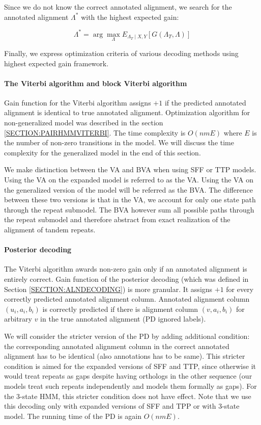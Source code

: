Since we do not know the correct annotated alignment, we search for the
annotated alignment $\Lambda^*$ with the highest expected gain:

\begin{equation}
\Lambda^* = \arg\max_{\Lambda}
E_{\Lambda_T\mid X, Y}\left[G(\Lambda_T, \Lambda)\right]
\end{equation}

Finally, we express optimization criteria of various decoding methods using
highest expected gain framework.

\paragraph{The Viterbi algorithm and block Viterbi algorithm} Gain function for
the Viterbi algorithm assigns $+1$ if the predicted annotated alignment is identical to true
annotated alignment. Optimization algorithm for non-generalized model was
described in the section \ref{SECTION:PAIRHMMVITERBI}. The time complexity is
$O(nmE)$ where $E$ is the number of non-zero transitions in the model. We will
discuss the time complexity for the generalized model in the end of this
section.

We make distinction between the VA and BVA when using SFF or TTP models. Using
the VA on the expanded model is referred to as the VA. Using the VA on the
generalized version of the model will be referred as the BVA. The difference
between these two versions is that in the VA, we account for only one state
path through the repeat submodel.  The BVA however sum all possible paths
through the repeat submodel and therefore abstract from exact realization of
the alignment of tandem repeats.

\paragraph{Posterior decoding}
The Viterbi algorithm awards non-zero gain only if an annotated alignment is
entirely correct. Gain function of the posterior decoding (which was defined
in Section \ref{SECTION:ALNDECODING}) is more granular. It assigns $+1$ for
every correctly predicted annotated alignment column. Annotated alignment
column $(u_i, a_i, b_i)$ is correctly predicted if there is alignment column
$(v, a_i, b_i)$ for arbitrary $v$ in the true annotated alignment (PD ignored
labels). 

We will consider the stricter version of the PD by adding
additional condition: the corresponding annotated alignment column in the
correct annotated alignment has to be identical (also annotations has to be
same).  This stricter condition is aimed for the expanded versions of SFF and
TTP, since otherwise it would treat repeats as gaps despite having orthologs in
the other sequence (our models treat such repeats independently and models them
formally as gaps).  For the 3-state HMM, this stricter condition does not have
effect. Note that we use this decoding only with expanded versions of SFF and
TPP or with 3-state model. The running time of the PD is again
$O(nmE)$.

